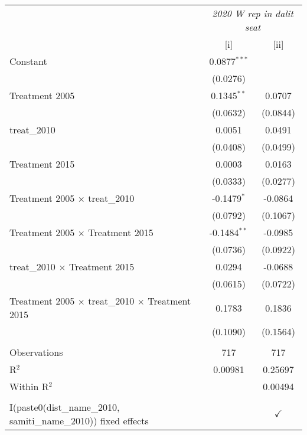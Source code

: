 
\begingroup
\centering
\begin{tabular}{lcc}
   \toprule
    & \multicolumn{2}{c}{\textit{2020 W rep in dalit seat}}\\
                                                                     & [i]            & [ii]\\  
   \midrule 
   Constant                                                          & 0.0877$^{***}$ &   \\   
                                                                     & (0.0276)       &   \\   
   Treatment 2005                                                    & 0.1345$^{**}$  & 0.0707\\   
                                                                     & (0.0632)       & (0.0844)\\   
   treat\_2010                                                       & 0.0051         & 0.0491\\   
                                                                     & (0.0408)       & (0.0499)\\   
   Treatment 2015                                                    & 0.0003         & 0.0163\\   
                                                                     & (0.0333)       & (0.0277)\\   
   Treatment 2005 $\times$ treat\_2010                               & -0.1479$^{*}$  & -0.0864\\   
                                                                     & (0.0792)       & (0.1067)\\   
   Treatment 2005 $\times$ Treatment 2015                            & -0.1484$^{**}$ & -0.0985\\   
                                                                     & (0.0736)       & (0.0922)\\   
   treat\_2010 $\times$ Treatment 2015                               & 0.0294         & -0.0688\\   
                                                                     & (0.0615)       & (0.0722)\\   
   Treatment 2005 $\times$ treat\_2010 $\times$ Treatment 2015       & 0.1783         & 0.1836\\   
                                                                     & (0.1090)       & (0.1564)\\   
    \\
   Observations                                                      & 717            & 717\\  
   R$^2$                                                             & 0.00981        & 0.25697\\  
   Within R$^2$                                                      &                & 0.00494\\  
    \\
   I(paste0(dist\_name\_2010, samiti\_name\_2010)) fixed effects     &                & $\checkmark$\\   
   \bottomrule
\end{tabular}
\par\endgroup


